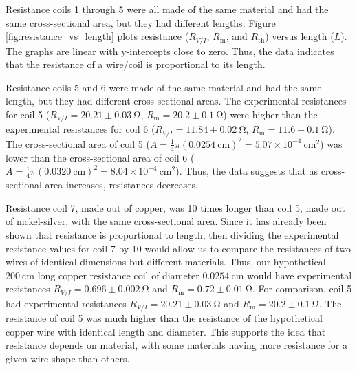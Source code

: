 \documentclass[12pt]{iopart} %
\gdef\sci#1#2{#1 \times 10^{#2}}
\gdef\units#1{~\mathrm{#1}}
\begin{document}
Resistance coils 1 through 5 were all made of the same material and had the same cross-sectional area, but they had different lengths.
Figure \ref{fig:resistance_vs_length} plots resistance ($R_{V/I}$, $R_\mathrm{m}$, and $R_\mathrm{th}$) versus length ($L$).
The graphs are linear with y-intercepts close to zero.
Thus, the data indicates that the resistance of a wire/coil is proportional to its length.

Resistance coils 5 and 6 were made of the same material and had the same length, but they had different cross-sectional areas.
The experimental resistances for coil 5 ($R_{V/I} = 20.21 \pm 0.03 \units{\Omega}$, $R_\mathrm{m} = 20.2 \pm 0.1 \units{\Omega}$) were higher than the experimental resistances for coil 6 ($R_{V/I} = 11.84 \pm 0.02 \units{\Omega}$, $R_\mathrm{m} = 11.6 \pm 0.1 \units{\Omega}$).
The cross-sectional area of coil 5 ($A = \frac{1}{4} \pi (0.0254 \units{cm})^2 = \sci{5.07}{-4} \units{cm^2}$) was lower than the cross-sectional area of coil 6 ($A = \frac{1}{4} \pi (0.0320 \units{cm})^2 = \sci{8.04}{-4} \units{cm^2}$).
Thus, the data suggests that as cross-sectional area increases, resistances decreases.

Resistance coil 7, made out of copper, was 10 times longer than coil 5, made out of nickel-silver, with the same cross-sectional area. 
Since it has already been shown that resistance is proportional to length, then dividing the experimental resistance values for coil 7 by 10 would allow us to compare the resistances of two wires of identical dimensions but different materials.
Thus, our hypothetical $200 \units{cm}$ long copper resistance coil of diameter $0.0254 \units{cm}$ would have experimental resistances $R_{V/I} = 0.696 \pm 0.002 \units{\Omega}$ and $R_\mathrm{m} = 0.72 \pm 0.01 \units{\Omega}$.
For comparison, coil 5 had experimental resistances $R_{V/I} = 20.21 \pm 0.03 \units{\Omega}$ and $R_\mathrm{m} = 20.2 \pm 0.1 \units{\Omega}$.
The resistance of coil 5 was much higher than the resistance of the hypothetical copper wire with identical length and diameter.
This supports the idea that resistance depends on material, with some materials having more resistance for a given wire shape than others.
\end{document}
